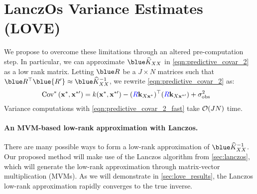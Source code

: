 \section{LanczOs Variance Estimates (LOVE)}
\label{sec:love_method}



We propose to overcome these limitations through an altered pre-computation step.
In particular, we can approximate $\blue \trainK$ in \cref{eqn:predictive_covar_2} as a low rank matrix.
Letting $\blue \bR$ be a $J \times N$ matrices such that $\blue \bR^\top \blue{\bR'} \approx \blue \trainK^{-1}$, we rewrite \cref{eqn:predictive_covar_2} as:
%
\begin{align}
  \text{Cov}^* \left( \mathbf{x}^*, \mathbf{x}^{*\prime} \right)
  &= k(\mathbf{x}^*, \mathbf{x}^{*\prime}) - ({\color{blue} R} \mathbf{k}_{X\mathbf{x}^*})^\top ({\color{blue} R} \mathbf{k}_{X\mathbf{x}^{*\prime}}) + \sigma^2_\text{obs}
  \label{eqn:predictive_covar_2_fast}
\end{align}
%
Variance computations with \cref{eqn:predictive_covar_2_fast} take $\bigo{JN}$ time.

\paragraph{An MVM-based low-rank approximation with Lanczos.}
There are many possible ways to form a low-rank approximation of $\blue \trainK^{-1}$.
Our proposed method will make use of the Lanczos algorithm from \cref{sec:lanczos}, which will generate the low-rank approximation through matrix-vector multiplication (MVMs).
As we will demonstrate in \cref{sec:love_results}, the Lanczos low-rank approximation rapidly converges to the true inverse.

